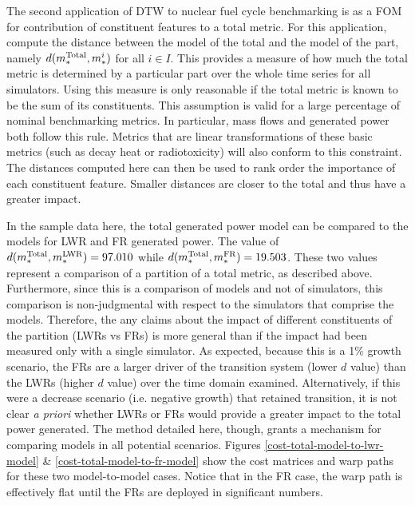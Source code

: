 The second application of DTW to nuclear fuel cycle benchmarking is as a
FOM for contribution of constituent features to a total metric. For this application, 
compute the distance between the model of the total and the model of the 
part, namely $d(m_*^{\mathrm{Total}}, m_*^i)$ for all $i \in I$. This provides a 
measure of how much the total metric is determined by a particular part
over the whole time series for all simulators.
Using this measure is only reasonable if the total metric is known 
to be the sum of its constituents.  This assumption is valid for 
a large percentage of nominal benchmarking metrics. In particular, 
mass flows and generated power both follow this rule. Metrics that are 
linear transformations of these basic metrics (such as decay heat or 
radiotoxicity) will also conform to this constraint. The distances computed here
can then be used to rank order the importance of each constituent feature. 
Smaller distances are closer to the total and thus have a greater impact.

In the sample data here, the total generated power model can be compared to 
the models for LWR and FR generated power. The value of 
$d(m_*^{\mathrm{Total}}, m_*^{\mathrm{LWR}}) = 97.010$ while $d(m_*^{\mathrm{Total}}, m_*^{\mathrm{FR}}) = 19.503$.
These two values represent a comparison of a partition of a total metric, 
as described above.  Furthermore, since this is a comparison of models and not
of simulators, this comparison is non-judgmental with respect to the 
simulators that comprise the models. Therefore, the any claims about the
impact of different constituents of the partition (LWRs vs FRs) is more general
than if the impact had been measured only with a single simulator.
As expected, because this is a 1\% growth scenario, the FRs are a larger
driver of the transition system (lower $d$ value) than the 
LWRs (higher $d$ value) over the time domain examined. Alternatively, if this
were a decrease scenario (i.e. negative growth)
that retained transition, it is not clear \emph{a priori} whether LWRs or FRs would 
provide a greater impact to the total power generated. The method detailed
here, though, grants a mechanism for comparing models in all potential 
scenarios. Figures 
\ref{cost-total-model-to-lwr-model} \& \ref{cost-total-model-to-fr-model}
show the cost matrices and warp paths for these two model-to-model cases.
Notice that in the
FR case, the warp path is effectively flat until the FRs are deployed in 
significant numbers. 
 
